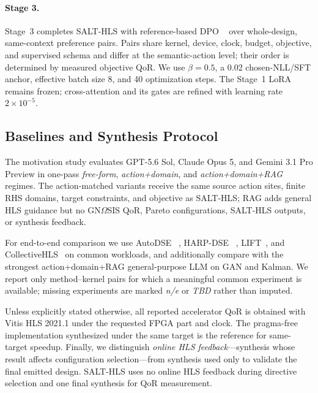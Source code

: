 \paragraph{Stage 3.}
Stage~3 completes SALT-HLS with reference-based DPO
~\cite{rafailov2023dpo} over whole-design, same-context preference
pairs. Pairs share kernel, device, clock, budget, objective, and
supervised schema and differ at the semantic-action level; their order
is determined by measured objective QoR. We use $\beta=0.5$, a 0.02
chosen-NLL/SFT anchor, effective batch size 8, and 40 optimization
steps. The Stage~1 LoRA remains frozen; cross-attention and its gates
are refined with learning rate $2\times10^{-5}$.


\subsection{Baselines and Synthesis Protocol}
\label{subsec:eval-baselines}

The motivation study evaluates GPT-5.6 Sol, Claude Opus 5, and
Gemini 3.1 Pro Preview in one-pass \emph{free-form},
\emph{action+domain}, and \emph{action+domain+RAG} regimes.
The action-matched variants receive the same source action sites,
finite RHS domains, target constraints, and objective as SALT-HLS;
RAG adds general HLS guidance but no GN$\Omega$SIS QoR,
Pareto configurations, SALT-HLS outputs, or synthesis feedback.

For end-to-end comparison we use AutoDSE
~\cite{sohrabizadeh2020autodse}, HARP-DSE
~\cite{sohrabizadeh2023harp}, LIFT~\cite{prakriya2025lift},
and CollectiveHLS~\cite{ferikoglou2024collectivehls} on common
workloads, and additionally compare with the strongest
action+domain+RAG general-purpose LLM on GAN and Kalman.
We report only method--kernel pairs for which a meaningful common
experiment is available; missing experiments are marked
\emph{n/e} or \emph{TBD} rather than imputed.

Unless explicitly stated otherwise, all reported accelerator QoR is
obtained with Vitis HLS 2021.1 under the requested FPGA part and clock.
The pragma-free implementation synthesized under the same target is
the reference for same-target speedup. Finally, we distinguish
\emph{online HLS feedback}---synthesis whose result affects configuration
selection---from synthesis used only to validate the final emitted design.
SALT-HLS uses no online HLS feedback during directive selection and one final synthesis for QoR measurement.